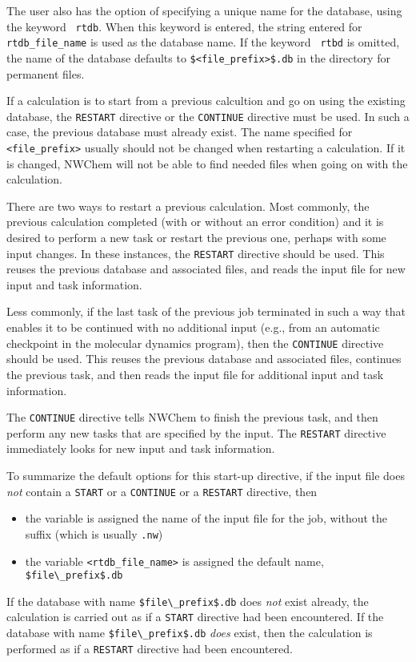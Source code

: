The user also has the option of
specifying a unique name for the database, using the keyword {\tt
  rtdb}.  When this keyword is entered, the string entered for {\tt
  rtdb\_file\_name} is used as the database name.  If the keyword {\tt
  rtbd} is omitted, the name of the database defaults to
\verb+$<file_prefix>$.db+ in the directory for permanent files.

If a calculation is to start from a previous calcultion and go on
using the existing database, the \verb+RESTART+ directive or the
\verb+CONTINUE+ directive must be used.  In such a case, the previous
database must already exist.  The name specified for {\tt <file\_prefix>} 
usually should
not be changed when restarting a calculation.  If it is changed, NWChem 
will not
be able to find needed files when going on with the
calculation.

There are two ways to restart a previous calculation.  Most commonly,
the previous calculation completed (with or without an error
condition) and it is desired to perform a new task or restart the
previous one, perhaps with some input changes.  In these instances,
the \verb+RESTART+ directive should be used.  This reuses the previous
database and associated files, and reads the input file for new input
and task information.

Less commonly, if the last task of the previous job terminated in such
a way that enables it to be continued with no additional
input (e.g., from an automatic
checkpoint in the molecular dynamics program), then the 
\verb+CONTINUE+ directive should be used.  This reuses
the previous database and associated files, continues the previous
task, and then reads the input file for additional input and task
information.

The \verb+CONTINUE+ directive tells NWChem to finish the
previous task, and then perform any new tasks that are specified by
the input. The \verb+RESTART+ directive immediately looks for new
input and task information.

To summarize the default options for this start-up directive, if the 
input file does {\em not} contain a \verb+START+ or a \verb+CONTINUE+ or a
\verb+RESTART+ directive, then
\begin{itemize}
  \item the variable {\tt <file prefix>} is assigned the name of the 
input file for the job, without the suffix (which is usually \verb+.nw+)
  \item the variable {\tt <rtdb\_file\_name>} is assigned the default name,
\verb+$file\_prefix$.db+
\end{itemize}
If the database with name \verb+$file\_prefix$.db+ does {\it not} 
exist already,
the calculation is carried out as if a \verb+START+ directive had
been encountered.  If the database with name \verb+$file\_prefix$.db+
{\it does} exist, then the calculation is performed as if a
\verb+RESTART+ directive had been encountered.  

